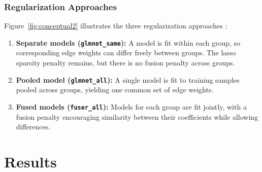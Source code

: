 \documentclass[]{Liebert_Author_revised}
\providecommand{\DIFadd}[1]{{\ifmmode\else\leavevmode\fi\color{blue}#1}} %
\providecommand{\DIFaddbegin}{} %
\providecommand{\DIFaddend}{} %
\begin{document}
\subsubsection{Regularization Approaches}
 \DIFaddbegin \DIFadd{Figure~\ref{fig:conceptual2} illustrates the }\DIFaddend three regularization approaches :
\begin{enumerate}
    \item \textbf{ \DIFaddbegin \DIFadd{Separate models }\DIFaddend (\texttt{glmnet\_same}):}
     \DIFaddbegin \DIFadd{A model is fit within each group, so corresponding edge weights can differ freely between groups. The lasso sparsity penalty remains, but there is no fusion penalty across groups.
    }\DIFaddend \item  \DIFaddbegin \DIFadd{\textbf{Pooled model (\texttt{glmnet\_all}):}
    A single model is fit to training samples pooled across groups, yielding one common set of edge weights.
    }\DIFaddend \item \textbf{ \DIFaddbegin \DIFadd{Fused models }\DIFaddend (\texttt{fuser\_all}):}
     \DIFaddbegin \DIFadd{Models for each group are fit jointly, with a fusion penalty encouraging similarity between their coefficients while allowing differences.
}\DIFaddend \end{enumerate}


\section{Results}
\end{document}
